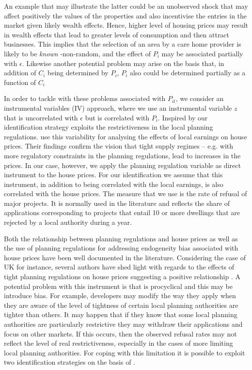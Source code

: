 \documentclass[12pt,letterpaper]{article}
\begin{document}
  An example that may illustrate the latter could be an unobserved shock that may affect positively the values of the properties and also incentivise
   the entries in the market given likely wealth effects. Hence, higher level of housing prices may result in
    wealth effects that lead to greater levels of consumption and then attract businesses. This implies that the selection
     of an area by a care home provider is likely to be \textit{known} -non-random,  and the effect of $P_{i}$ may be associated partially 
     with $\epsilon$. Likewise another potential problem may arise on the basis 
     that, in addition of $C_{i}$ being determined by $P_{i}$, $P_{i}$ also could be determined partially as 
     a function of $C_{i}$
     
     In order to tackle with these problems associated with $P_{it}$, we consider an instrumental variables (IV) approach, 
     where we use an instrumental variable $z$  that is uncorrelated with $\epsilon$ but is correlated
       with $P_{i}$. Inspired by \citet{hilber2016supply} our identification 
       strategy exploits the restrictiveness in the local planning regulations. 
       \citet{hilber2016supply} use this variability for analysing the effects of local earnings
 on house prices. Their findings confirm the vision that tight supply regimes – e.g. with more regulatory 
 constraints in the planning regulations, lead to increases in the prices. In our case, however, we apply 
the planning regulation variable as direct instrument to the house prices. For our identification we assume that this instrument,
  in addition to being correlated with the local earnings, is also correlated with the house prices. The measure that we use is the 
 rate of refusal of major projects. It is normally used in the literature and 
 reflects the share of applications corresponding to projects that entail 10 or more 
 dwellings that are rejected by a local authority during a year.  
 
 Both the relationship between
  planning regulations and house prices as well as the use of planning regulations 
  for addressing endogeneity bias associated with house prices have been well documented in the literature. 
  Considering the case of UK for instance, several authors have shed light with regards to the effects of tight planning 
  regulations on house prices suggesting a positive relationship \citep{cheshire2009, cheshire2014, barker2004barker, hilber2016supply}.
  A potential problem with this instrument is that is procyclical and this may 
be introduce bias. For example, developers may modify the way they apply when they are aware of the level
 of tightness of certain local planning authorities are tighter than others. It may happen that if they know
  that some local planning authorities are particularly restrictive they may withdraw their applications and focus
   on other markets. If this occurs, then the observed refusal rates may not reflect the level of real 
   restrictiveness, especially in the cases of more limiting local planning authorities. 
 For coping with this limitation it is possible to exploit two identification strategies on the basis of \citet{hilber2016supply}.
    
\end{document}

